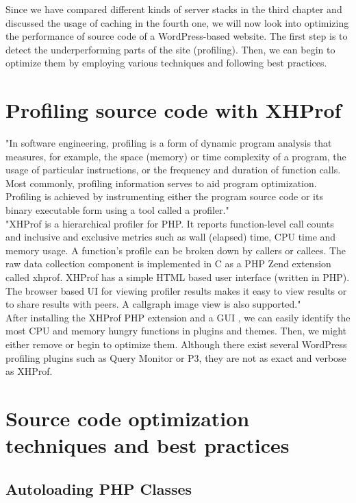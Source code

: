 Since we have compared different kinds of server stacks in the third chapter and discussed the usage of caching in the fourth one, we will now look into optimizing the performance of source code of a WordPress-based website. The first step is to detect the underperforming parts of the site (profiling). Then, we can begin to optimize them by employing various techniques and following best practices.

\section{Profiling source code with XHProf}

"In software engineering, profiling is a form of dynamic program analysis that measures, for example, the space (memory) or time complexity of a program, the usage of particular instructions, or the frequency and duration of function calls. Most commonly, profiling information serves to aid program optimization. Profiling is achieved by instrumenting either the program source code or its binary executable form using a tool called a profiler." \cite{Wiki:Profiling} \\

"XHProf is a hierarchical profiler for PHP. It reports function-level call counts and inclusive and exclusive metrics such as wall (elapsed) time, CPU time and memory usage. A function's profile can be broken down by callers or callees. The raw data collection component is implemented in C as a PHP Zend extension called xhprof. XHProf has a simple HTML based user interface (written in PHP). The browser based UI for viewing profiler results makes it easy to view results or to share results with peers. A callgraph image view is also supported." \cite{XHProf:About} \\

After installing the XHProf PHP extension and a GUI \cite{Lamosty.com:XHProf}, we can easily identify the most CPU and memory hungry functions in plugins and themes. Then, we might either remove or begin to optimize them. Although there exist several WordPress profiling plugins such as Query Monitor or P3, they are not as exact and verbose as XHProf.

\section{Source code optimization techniques and best practices}

\subsection{Autoloading PHP Classes}

